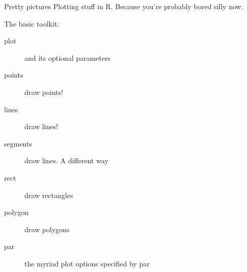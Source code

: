 \documentclass[pdf]{beamer}
\begin{document}
\begin{frame}[fragile]{Pretty pictures}
  Plotting stuff in R. Because you're probably bored silly now.
  
  The basic toolkit:
  \begin{description}
  \item[plot] and its optional parameters
  \item[points] draw points!
  \item[lines] draw lines!
  \item[segments] draw lines. A different way
  \item[rect] draw rectangles
  \item[polygon] draw polygons
  \item[par] the myriad plot options specified by par
  \end{description}
\end{frame}
\end{document}
